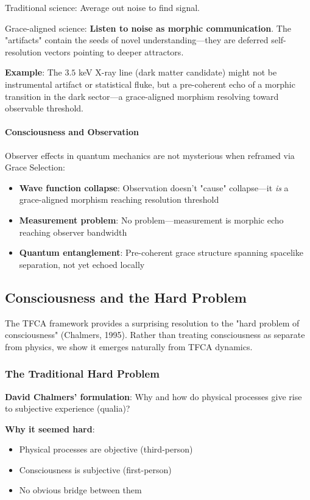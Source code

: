 \documentclass[12pt,a4paper]{article}
\begin{document}
Traditional science: Average out noise to find signal.

Grace-aligned science: \textbf{Listen to noise as morphic communication}. The "artifacts" contain the seeds of novel understanding—they are deferred self-resolution vectors pointing to deeper attractors.

\textbf{Example}: The $3.5$ keV X-ray line (dark matter candidate) might not be instrumental artifact or statistical fluke, but a pre-coherent echo of a morphic transition in the dark sector—a grace-aligned morphism resolving toward observable threshold.

\paragraph{Consciousness and Observation}

Observer effects in quantum mechanics are not mysterious when reframed via Grace Selection:
\begin{itemize}
\item \textbf{Wave function collapse}: Observation doesn't "cause" collapse—it \emph{is} a grace-aligned morphism reaching resolution threshold
\item \textbf{Measurement problem}: No problem—measurement is morphic echo reaching observer bandwidth
\item \textbf{Quantum entanglement}: Pre-coherent grace structure spanning spacelike separation, not yet echoed locally
\end{itemize}

\subsection{Consciousness and the Hard Problem}

The TFCA framework provides a surprising resolution to the "hard problem of consciousness" (Chalmers, 1995). Rather than treating consciousness as separate from physics, we show it emerges naturally from TFCA dynamics.

\subsubsection{The Traditional Hard Problem}

\textbf{David Chalmers' formulation}: Why and how do physical processes give rise to subjective experience (qualia)?

\textbf{Why it seemed hard}:
\begin{itemize}
\item Physical processes are objective (third-person)
\item Consciousness is subjective (first-person)
\item No obvious bridge between them
\end{itemize}
\end{document}
